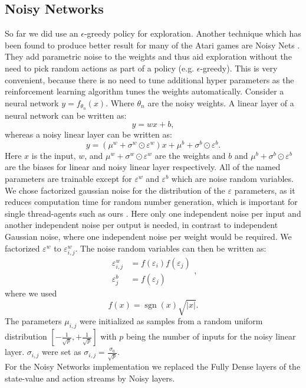 \subsection{Noisy Networks\anna}
So far we did use an $\epsilon$-greedy policy for exploration. Another technique which has been found to produce better result for many of the Atari games are Noisy Nets \cite{DBLP:journals/corr/FortunatoAPMOGM17}. They add parametric noise to the weights and thus aid exploration without the need to pick random actions as part of a policy (e.g. $\epsilon$-greedy). This is very convenient, because there is no need to tune additional hyper parameters as the reinforcement learning algorithm tunes the weights automatically.
Consider a neural network $y=f_{\theta_n}(x)$. Where $\theta_n$ are the noisy weights. A linear layer of a neural network can be written as: 
\begin{equation}
y = w x+b,
\end{equation}
whereas a noisy linear layer can be written as:
\begin{equation}
y =\left(\mu^{w}+\sigma^{w} \odot \varepsilon^{w}\right) x+\mu^{b}+\sigma^{b} \odot \varepsilon^{b}.
\end{equation}
Here $x$ is the input, $w$, and $\mu^{w}+\sigma^{w} \odot \varepsilon^{w}$ are the weights and $b$ and $\mu^{b}+\sigma^{b} \odot \varepsilon^{b}$ are the biases for linear and noisy linear layer respectively. All of the named parameters are trainable except for $\varepsilon^w$ and $\varepsilon^b$ which are noise random variables. We chose factorized gaussian noise for the distribution of the $\varepsilon$ parameters, as it reduces computation time for random number generation, which is important for single thread-agents such as ours \cite{DBLP:journals/corr/FortunatoAPMOGM17}. Here only one independent noise per input and another independent noise per output is needed, in contrast to independent Gaussian noise, where one independent noise per weight would be required.
We factorized $\varepsilon^w$ to $\varepsilon^w_{i,j}$.
The noise random variables can then be written as:
\begin{equation}
\begin{aligned} \varepsilon_{i, j}^{w} &=f\left(\varepsilon_{i}\right) f\left(\varepsilon_{j}\right) \\ \varepsilon_{j}^{b} &=f\left(\varepsilon_{j}\right) \end{aligned},
\end{equation}
where we used \begin{equation}
f(x)=\operatorname{sgn}(x) \sqrt{|x|}.
\end{equation}
The parameters $\mu_{i,j}$ were initialized as samples from a random uniform distribution $\left[-\frac{1}{\sqrt{p}},+\frac{1}{\sqrt{p}}\right]$ with $p$ being the number of inputs for the noisy linear layer. $\sigma_{i, j}$ were set as $\sigma_{i, j}=\frac{\sigma_{0}}{\sqrt{p}}$. \\
For the Noisy Networks implementation we replaced the Fully Dense layers of the state-value and action streams by Noisy layers. %
\cite{DBLP:journals/corr/FortunatoAPMOGM17}